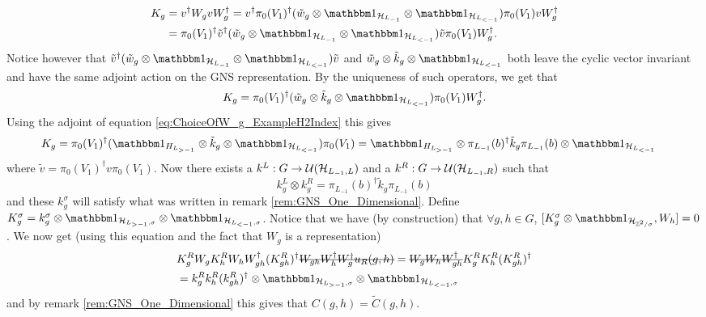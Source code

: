 \documentclass[11pt,a4paper,twoside]{article}
\numberwithin{equation}{section}
\begin{document}
	\begin{align}
		K_g&=v^\dagger W_g v W_g^\dagger=v^\dagger \pi_{0}(V_1)^{\dagger}(\tilde{w}_g\otimes\id_{\HH_{L_{-1}}}\otimes\id_{\HH_{L_{<-1}}}) \pi_{0}(V_1) v W_g^\dagger\\
		&=\pi_{0}(V_1)^{\dagger}\tilde v^\dagger(\tilde{w}_g\otimes\id_{\HH_{L_{-1}}}\otimes\id_{\HH_{L_{<-1}}}) \tilde v \pi_{0}(V_1) W_g^\dagger.
	\end{align}
	Notice however that $\tilde v^\dagger(\tilde{w}_g\otimes\id_{\HH_{L_{-1}}}\otimes\id_{\HH_{L_{<-1}}}) \tilde v$ and $\tilde{w}_g\otimes\tilde{k}_g\otimes\id_{\HH_{L_{<-1}}}$ both leave the cyclic vector invariant and have the same adjoint action on the GNS representation. By the uniqueness of such operators, we get that
	\begin{equation}
		K_g=\pi_{0}(V_1)^{\dagger}(\tilde{w}_g\otimes\tilde{k}_g\otimes\id_{\HH_{L_{<-1}}}) \pi_{0}(V_1) W_g^\dagger.
	\end{equation}
	Using the adjoint of equation \eqref{eq:ChoiceOfW_g_ExampleH2Index} this gives
	\begin{align}
		K_g&=\pi_{0}(V_1)^{\dagger}(\id_{H_{L_{>-1}}}\otimes \tilde k_g \otimes\id_{\HH_{L_{<-1}}}) \pi_{0}(V_1)=\id_{H_{L_{>-1}}}\otimes \pi_{L_{-1}}(b)^\dagger \tilde k_g \pi_{L_{-1}}(b) \otimes\id_{\HH_{L_{<-1}}}
	\end{align}
	where $\tilde{v}=\pi_0(V_1)^\dagger v\pi_0(V_1)$. Now there exists a $k^L:G\rightarrow \mathcal U(\mathcal H_{L_{-1},L})$ and a $k^R:G\rightarrow \mathcal U(\mathcal H_{L_{-1},R})$ such that
	\begin{equation}
		k^L_g\otimes k^R_g=\pi_{L_{-1}}(b)^\dagger \tilde k_g \pi_{L_{-1}}(b)
	\end{equation}
	and these $k^\sigma_g$ will satisfy what was written in remark \ref{rem:GNS_One_Dimensional}. Define $K^\sigma_g=k^\sigma_g\otimes\id_{\HH_{L_{>-1},\sigma}}\otimes\id_{\HH_{L_{<-1},\sigma}}$. Notice that we have (by construction) that $\forall g,h\in G$, $[K^\sigma_g\otimes\id_{\HH_{\ZZ^2/\sigma}},W_h]=0$. We now get (using this equation and the fact that $W_g$ is a representation)
	\begin{align}
		&K_g^R W_g K_h^R W_h W_{gh}^\dagger (K_{gh}^R)^\dagger \stkout{W_{gh}W_h^\dagger W_g^\dagger u_R(g,h)}=\stkout{W_g W_h W_{gh}^\dagger} K_g^R K_h^R (K_{gh}^R)^\dagger\\
		\nonumber
		&=k_g^R k_h^R (k_{gh}^R)^\dagger\otimes \id_{\HH_{L_{>-1},\sigma}}\otimes\id_{\HH_{L_{<-1},\sigma}}
	\end{align}
	and by remark \ref{rem:GNS_One_Dimensional} this gives that $C(g,h)=\tilde{C}(g,h)$.
\end{document}
